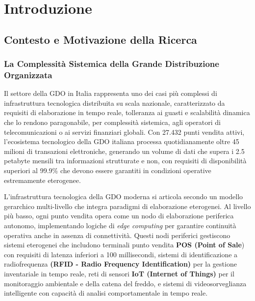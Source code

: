 \chapter{Introduzione}
\label{cap1_introduction}

\section{Contesto e Motivazione della Ricerca}

\subsection{La Complessità Sistemica della Grande Distribuzione Organizzata}

Il settore della \gls{GDO} in Italia rappresenta uno dei casi più complessi di infrastruttura tecnologica distribuita su scala nazionale, caratterizzato da requisiti di elaborazione in tempo reale, tolleranza ai guasti e scalabilità dinamica che lo rendono paragonabile, per complessità sistemica, agli operatori di telecomunicazioni o ai servizi finanziari globali. 
Con 27.432 punti vendita attivi\autocite{istat2024}, l'ecosistema tecnologico della \gls{GDO} italiana processa quotidianamente oltre 45 milioni di transazioni elettroniche, generando un volume di dati che supera i 2.5 petabyte mensili tra informazioni strutturate e non, con requisiti di disponibilità superiori al 99.9\% che devono essere garantiti in condizioni operative estremamente eterogenee.

L'infrastruttura tecnologica della GDO moderna si articola secondo un modello gerarchico multi-livello che integra paradigmi di elaborazione eterogenei. 
Al livello più basso, ogni punto vendita opera come un nodo di elaborazione periferica autonomo, implementando logiche di \textit{edge computing} per garantire continuità operativa anche in assenza di connettività. Questi nodi periferici gestiscono sistemi eterogenei che includono terminali punto vendita \textbf{\gls{POS} (Point of Sale}) con requisiti di latenza inferiori a 100 millisecondi, sistemi di identificazione a radiofrequenza \textbf{(RFID - Radio Frequency Identification)} per la gestione inventariale in tempo reale, reti di sensori \textbf{IoT (Internet of Things)} per il monitoraggio ambientale e della catena del freddo, e sistemi di videosorveglianza intelligente con capacità di analisi comportamentale in tempo reale.


